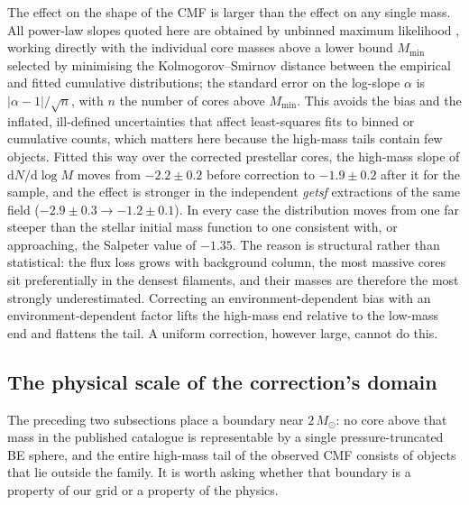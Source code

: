 \documentclass[11pt,a4paper]{article}
\newcommand{\msun}{M_{\odot}}
\begin{document}
The effect on the shape of the CMF is larger than the effect on any single
mass. All power-law slopes quoted here are obtained by unbinned maximum
likelihood \citep{Clauset+2009}, working directly with the individual core
masses above a lower bound $M_{\mathrm{min}}$ selected by minimising the
Kolmogorov--Smirnov distance between the empirical and fitted cumulative
distributions; the standard error on the log-slope $\alpha$ is
$|\alpha-1|/\sqrt{n}$, with $n$ the number of cores above $M_{\mathrm{min}}$.
This avoids the bias and the inflated, ill-defined uncertainties that affect
least-squares fits to binned or cumulative counts, which matters here because
the high-mass tails contain few objects. Fitted this way over the corrected
prestellar cores, the high-mass slope of $\mathrm{d}N/\mathrm{d}\log M$ moves
from $-2.2\pm0.2$ before correction to $-1.9\pm0.2$ after it for the
\citet{Konyves+2015} sample, and the effect is stronger in the independent
\emph{getsf} extractions of the same field ($-2.9\pm0.3\rightarrow
-1.2\pm0.1$). In every case the distribution moves from one far steeper than
the stellar initial mass function to one consistent with, or approaching, the
Salpeter value of $-1.35$. The reason is structural
rather than statistical: the flux loss grows with background column, the
most massive cores sit preferentially in the densest filaments, and their
masses are therefore the most strongly underestimated. Correcting an
environment-dependent bias with an environment-dependent factor lifts the
high-mass end relative to the low-mass end and flattens the tail. A uniform
correction, however large, cannot do this.

\subsection{The physical scale of the correction's domain}
\label{sec:lowmass}

The preceding two subsections place a boundary near $2\,\msun$: no core above
that mass in the published catalogue is representable by a single
pressure-truncated BE sphere, and the entire high-mass tail of the observed
CMF consists of objects that lie outside the family. It is worth asking
whether that boundary is a property of our grid or a property of the physics.
\end{document}
